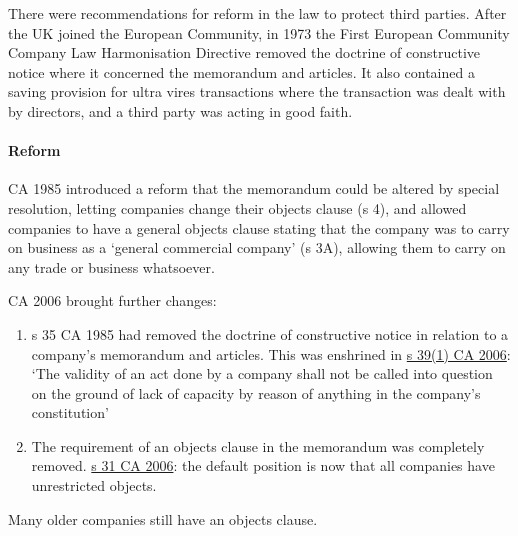 \documentclass[
]{article}
\providecommand{\tightlist}{%
  \setlength{\itemsep}{0pt}\setlength{\parskip}{0pt}}
\begin{document}
There were recommendations for reform in the law to protect third
parties. After the UK joined the European Community, in 1973 the First
European Community Company Law Harmonisation Directive removed the
doctrine of constructive notice where it concerned the memorandum and
articles. It also contained a saving provision for ultra vires
transactions where the transaction was dealt with by directors, and a
third party was acting in good faith.

\hypertarget{reform}{%
\paragraph{Reform}\label{reform}}

CA 1985 introduced a reform that the memorandum could be altered by
special resolution, letting companies change their objects clause (s 4),
and allowed companies to have a general objects clause stating that the
company was to carry on business as a `general commercial company' (s
3A), allowing them to carry on any trade or business whatsoever.

CA 2006 brought further changes:

\begin{enumerate}
\def\labelenumi{\arabic{enumi}.}
\tightlist
\item
  s 35 CA 1985 had removed the doctrine of constructive notice in
  relation to a company's memorandum and articles. This was enshrined in
  \href{https://www.legislation.gov.uk/ukpga/2006/46/section/39}{s 39(1)
  CA 2006}: `The validity of an act done by a company shall not be
  called into question on the ground of lack of capacity by reason of
  anything in the company's constitution'
\item
  The requirement of an objects clause in the memorandum was completely
  removed.
  \href{https://www.legislation.gov.uk/ukpga/2006/46/section/31}{s 31 CA
  2006}: the default position is now that all companies have
  unrestricted objects.
\end{enumerate}

Many older companies still have an objects clause.
\end{document}

